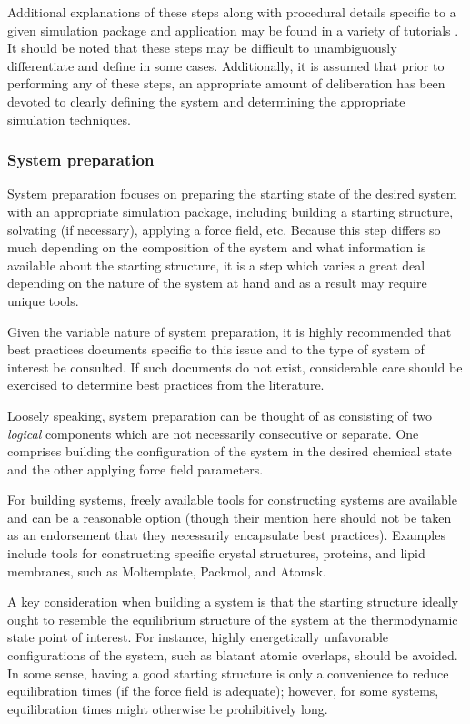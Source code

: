 \documentclass[9pt,bestpractices]{livecoms}
\begin{document}
Additional explanations of these steps along with procedural details specific to a given simulation package and application may be found in a variety of tutorials \citep{LemkulTutorials, AmberBeginner}.
It should be noted that these steps may be difficult to unambiguously differentiate and define in some cases.
Additionally, it is assumed that prior to performing any of these steps, an appropriate amount of deliberation has been devoted to clearly defining the system and determining the appropriate simulation techniques.

\subsubsection{System preparation}

System preparation focuses on preparing the starting state of the desired system with an appropriate simulation package, including building a starting structure, solvating (if necessary), applying a force field, etc.
Because this step differs so much depending on the composition of the system and what information is available about the starting structure, it is a step which varies a great deal depending on the nature of the system at hand and as a result may require unique tools.

Given the variable nature of system preparation, it is highly recommended that best practices documents specific to this issue and to the type of system of interest be consulted.
If such documents do not exist, considerable care should be exercised to determine best practices from the literature.

Loosely speaking, system preparation can be thought of as consisting of two \emph{logical} components which are not necessarily consecutive or separate.
One comprises building the configuration of the system in the desired chemical state and the other applying force field parameters.

For building systems, freely available tools for constructing systems are available and can be a reasonable option (though their mention here should not be taken as an endorsement that they necessarily encapsulate best practices).
Examples include tools for constructing specific crystal structures, proteins, and lipid membranes, such as Moltemplate, Packmol, and Atomsk.

A key consideration when building a system is that the starting structure ideally ought to resemble the equilibrium structure of the system at the thermodynamic state point of interest.
For instance, highly energetically unfavorable configurations of the system, such as blatant atomic overlaps, should be avoided.
In some sense, having a good starting structure is only a convenience to reduce equilibration times (if the force field is adequate); however, for some systems, equilibration times might otherwise be prohibitively long.
\end{document}
